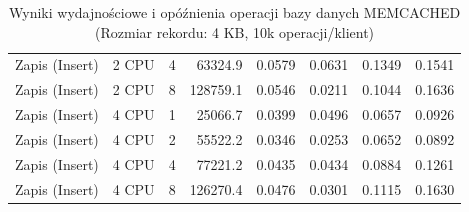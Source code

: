 \begin{table}[ht]
{\begin{tabular}{llcrrrrr}
Zapis (Insert) & 2 CPU & 4 & 63324.9 & 0.0579 & 0.0631 & 0.1349 & 0.1541 \\
Zapis (Insert) & 2 CPU & 8 & 128759.1 & 0.0546 & 0.0211 & 0.1044 & 0.1636 \\
Zapis (Insert) & 4 CPU & 1 & 25066.7 & 0.0399 & 0.0496 & 0.0657 & 0.0926 \\
Zapis (Insert) & 4 CPU & 2 & 55522.2 & 0.0346 & 0.0253 & 0.0652 & 0.0892 \\
Zapis (Insert) & 4 CPU & 4 & 77221.2 & 0.0435 & 0.0434 & 0.0884 & 0.1261 \\
Zapis (Insert) & 4 CPU & 8 & 126270.4 & 0.0476 & 0.0301 & 0.1115 & 0.1630 \\
\bottomrule
\end{tabular}%
}
\caption{Wyniki wydajnościowe i opóźnienia operacji bazy danych MEMCACHED (Rozmiar rekordu: 4 KB, 10k operacji/klient)}
\label{tab:latency_memcached_medium_10000}
\end{table}
